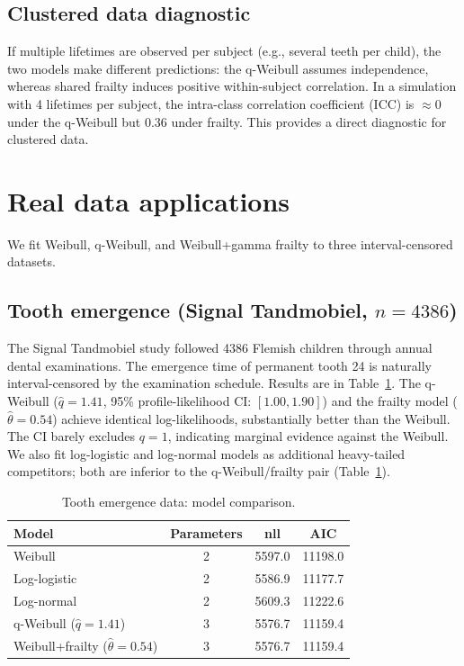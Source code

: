 \documentclass[12pt,a4paper]{article}
\begin{document}
\subsection{Clustered data diagnostic}

If multiple lifetimes are observed per subject (e.g., several teeth per child), the two models make different predictions: the q-Weibull assumes independence, whereas shared frailty induces positive within-subject correlation. In a simulation with 4 lifetimes per subject, the intra-class correlation coefficient (ICC) is $\approx 0$ under the q-Weibull but $0.36$ under frailty. This provides a direct diagnostic for clustered data.

\section{Real data applications}

We fit Weibull, q-Weibull, and Weibull+gamma frailty to three interval-censored datasets.

\subsection{Tooth emergence (Signal Tandmobiel, $n=4386$)}

The Signal Tandmobiel study \citep{straweib} followed 4386 Flemish children through annual dental examinations. The emergence time of permanent tooth 24 is naturally interval-censored by the examination schedule. Results are in Table~\ref{tab:tooth}. The q-Weibull ($\hat q=1.41$, 95\% profile-likelihood CI: $[1.00, 1.90]$) and the frailty model ($\hat\theta=0.54$) achieve identical log-likelihoods, substantially better than the Weibull. The CI barely excludes $q=1$, indicating marginal evidence against the Weibull. We also fit log-logistic and log-normal models as additional heavy-tailed competitors; both are inferior to the q-Weibull/frailty pair (Table~\ref{tab:tooth}).

\begin{table}[ht]
\centering
\caption{Tooth emergence data: model comparison.}
\begin{tabular}{lccc}
\toprule
Model & Parameters & nll & AIC \\
\midrule
Weibull & 2 & 5597.0 & 11198.0 \\
Log-logistic & 2 & 5586.9 & 11177.7 \\
Log-normal & 2 & 5609.3 & 11222.6 \\
q-Weibull ($\hat q=1.41$) & 3 & 5576.7 & 11159.4 \\
Weibull+frailty ($\hat\theta=0.54$) & 3 & 5576.7 & 11159.4 \\
\bottomrule
\end{tabular}
\label{tab:tooth}
\end{table}
\end{document}
